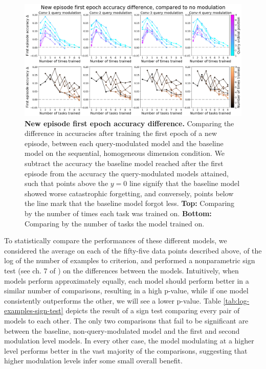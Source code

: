 \begin{figure}[!htb]
\centering
\includegraphics[width=\linewidth]{ch-results/figures/query_mod_benchmark/first_task_accuracy_comparison.png}
\caption{ {\bf New episode first epoch accuracy difference.} Comparing the difference in accuracies after training the first epoch of a new episode, between each query-modulated model and the baseline model on the sequential, homogeneous dimension condition. We subtract the accuracy the baseline model reached after the first episode from the accuracy the query-modulated models attained, such that points above the $y=0$ line signify that the baseline model showed worse catastrophic forgetting, and conversely, points below the line mark that the baseline model forgot less. \textbf{Top:} Comparing by the number of times each task was trained on. \textbf{Bottom:} Comparing by the number of tasks the model trained on. }
\label{fig:results-query-mod-benchmark-first-task-accuracy-comparison}
\end{figure}

To statistically compare the performances of these different models, we considered the average on each of the fifty-five data points described above, of the log of the number of examples to criterion, and performed a nonparametric sign test (see ch. 7 of \cite{Kvam2007}) on the differences between the models. Intuitively, when models perform approximately equally, each model should perform better in a similar number of comparisons, resulting in a high p-value, while if one model consistently outperforms the other, we will see a lower p-value. Table \ref{tab:log-examples-sign-test} depicts the result of a sign test comparing every pair of models to each other. The only two comparisons that fail to be significant are between the baseline, non-query-modulated model and the first and second modulation level models. In every other case, the model modulating at a higher level performs better in the vast majority of the comparisons, suggesting that higher modulation levels infer some small overall benefit. 


